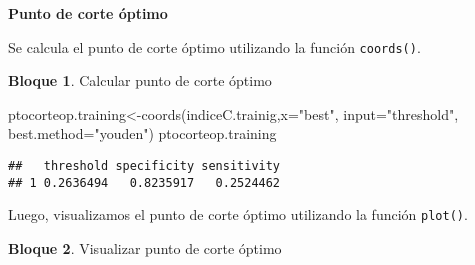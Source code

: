 \documentclass[
]{book}
\newenvironment{Shaded}{\begin{snugshade}}{\end{snugshade}}
\newcommand{\AttributeTok}[1]{\textcolor[rgb]{0.77,0.63,0.00}{#1}}
\newcommand{\ConstantTok}[1]{\textcolor[rgb]{0.00,0.00,0.00}{#1}}
\newcommand{\DecValTok}[1]{\textcolor[rgb]{0.00,0.00,0.81}{#1}}
\newcommand{\FloatTok}[1]{\textcolor[rgb]{0.00,0.00,0.81}{#1}}
\newcommand{\FunctionTok}[1]{\textcolor[rgb]{0.00,0.00,0.00}{#1}}
\newcommand{\NormalTok}[1]{#1}
\newcommand{\OtherTok}[1]{\textcolor[rgb]{0.56,0.35,0.01}{#1}}
\newcommand{\SpecialCharTok}[1]{\textcolor[rgb]{0.00,0.00,0.00}{#1}}
\newcommand{\StringTok}[1]{\textcolor[rgb]{0.31,0.60,0.02}{#1}}
\theoremstyle{definition}
\theoremstyle{definition}
\newtheorem{example}{Bloque}[chapter]
\theoremstyle{definition}
\theoremstyle{definition}
\theoremstyle{remark}
\begin{document}
\textbf{Punto de corte óptimo}

Se calcula el punto de corte óptimo utilizando la función \texttt{coords()}.

\begin{example}
\protect\hypertarget{exm:bloque84nbm}{}\label{exm:bloque84nbm}Calcular punto de corte óptimo
\end{example}

\begin{Shaded}
\begin{Highlighting}[]
\NormalTok{ptocorteop.training}\OtherTok{\textless{}{-}}\FunctionTok{coords}\NormalTok{(indiceC.trainig,}\AttributeTok{x=}\StringTok{"best"}\NormalTok{,}
                            \AttributeTok{input=}\StringTok{"threshold"}\NormalTok{,}
                            \AttributeTok{best.method=}\StringTok{"youden"}\NormalTok{)}
\NormalTok{ptocorteop.training}
\end{Highlighting}
\end{Shaded}

\begin{verbatim}
##   threshold specificity sensitivity
## 1 0.2636494   0.8235917   0.2524462
\end{verbatim}

\begin{Shaded}
\end{Shaded}

Luego, visualizamos el punto de corte óptimo utilizando la función \texttt{plot()}.

\begin{example}
\protect\hypertarget{exm:bloque85nbm}{}\label{exm:bloque85nbm}Visualizar punto de corte óptimo
\end{example}

\begin{Shaded}
\end{Shaded}
\end{document}

